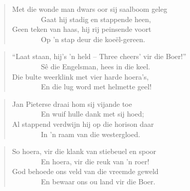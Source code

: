 \begin{verse}
Met die wonde man dwars oor sij saalboom geleg \\ 
\ \ \ \ \ \ \ \ Gaat hij stadig en stappende heen, \\ 
Geen teken van haas, hij rij peinsende voort \\ 
\ \ \ \ \ \ \ \ Op ’n stap deur die koe\"el-gereen. \\ 
\end{verse}

\begin{verse}
``Laat staan, hij’s ’n held -- Three cheers’ vir die Boer!'' \\ 
\ \ \ \ \ \ \ \ Sê die Engelsman, hees in die keel. \\ 
Die bulte weerklink met vier harde hoera’s, \\ 
\ \ \ \ \ \ \ \ En die lug word met helmette geel! \\ 
\end{verse}

\begin{verse}
Jan Pieterse draai hom sij vijande toe \\ 
\ \ \ \ \ \ \ \ En wuif hulle dank met sij hoed; \\ 
Al stappend verdwijn hij op die horison daar \\ 
\ \ \ \ \ \ \ \ In ’n raam van die westergloed. \\ 
\end{verse}

\begin{verse}
So hoera, vir die klank van stiebeuel en spoor \\ 
\ \ \ \ \ \ \ \ En hoera, vir die reuk van ’n roer! \\ 
God behoede ons veld van die vreemde geweld \\ 
\ \ \ \ \ \ \ \ En bewaar ons ou land vir die Boer. \\ 
\end{verse}